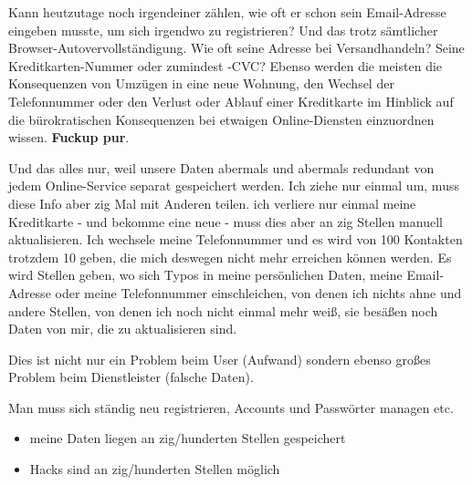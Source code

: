 \vspace{0.3cm}


\begin{Problem}

Kann heutzutage noch irgendeiner zählen, wie oft er schon sein Email-Adresse eingeben musste, um sich irgendwo zu registrieren? Und das trotz sämtlicher Browser-Autovervollständigung. Wie oft seine Adresse bei Versandhandeln? Seine Kreditkarten-Nummer oder zumindest -CVC? Ebenso werden die meisten die Konsequenzen von Umzügen in eine neue Wohnung, den Wechsel der Telefonnummer oder den Verlust oder Ablauf einer Kreditkarte im Hinblick auf die bürokratischen Konsequenzen bei etwaigen Online-Diensten einzuordnen wissen. \textbf{Fuckup pur}.

Und das alles nur, weil unsere Daten abermals und abermals redundant von jedem Online-Service separat gespeichert werden. Ich ziehe nur einmal um, muss diese Info aber zig Mal mit Anderen teilen. ich verliere nur einmal meine Kreditkarte - und bekomme eine neue - muss dies aber an zig Stellen manuell aktualisieren. Ich wechsele meine Telefonnummer und es wird von 100 Kontakten trotzdem 10 geben, die mich deswegen nicht mehr erreichen können werden. Es wird Stellen geben, wo sich Typos in meine persönlichen Daten, meine Email-Adresse oder meine Telefonnummer einschleichen, von denen ich nichts ahne und andere Stellen, von denen ich noch nicht einmal mehr weiß, sie besäßen noch Daten von mir, die zu aktualisieren sind.

Dies ist nicht nur ein Problem beim User (Aufwand) sondern ebenso großes Problem beim Dienstleister (falsche Daten).

\end{Problem}

\vspace{0.3cm}


\begin{Problem}[mangelhafte UX]

Man muss sich ständig neu registrieren, Accounts und Passwörter managen etc.

\end{Problem}

\vspace{0.3cm}



\begin{Problem}[Datenschutz]

\begin{itemize}
  \item meine Daten liegen an zig/hunderten Stellen gespeichert
  \item Hacks sind an zig/hunderten Stellen möglich
\end{itemize}

\end{Problem}

